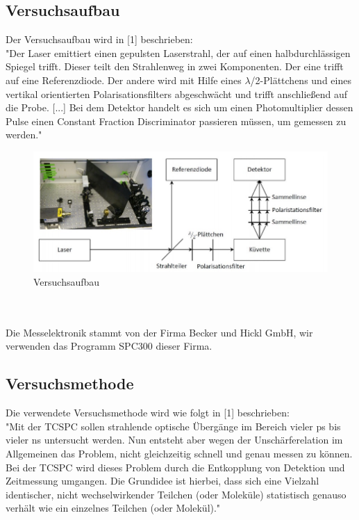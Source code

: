 \documentclass{article}
\begin{document}
\subsection{Versuchsaufbau}
Der Versuchsaufbau wird in [1] beschrieben:\\
"Der Laser emittiert einen gepulsten Laserstrahl, der auf einen halbdurchlässigen Spiegel trifft.
Dieser teilt den Strahlenweg in zwei Komponenten. Der eine trifft auf eine Referenzdiode. Der
andere wird mit Hilfe eines $\lambda$/2-Plättchens und eines vertikal orientierten Polarisationsfilters
abgeschwächt und trifft anschließend auf die Probe. [...] Bei dem Detektor handelt es sich
um einen Photomultiplier dessen Pulse einen Constant Fraction Discriminator passieren
müssen, um gemessen zu werden."
\begin{figure}[h]
  \centering
  \includegraphics[width=\textwidth]{Bilder/aufbau.jpeg}
  \caption{Versuchsaufbau}
\end{figure}
\\
\\
Die Messelektronik stammt von der Firma Becker und Hickl GmbH, wir verwenden das Programm SPC300 dieser Firma.


\subsection{Versuchsmethode}
Die verwendete Versuchsmethode wird wie folgt in [1] beschrieben: \\
"Mit der TCSPC sollen strahlende optische Übergänge im Bereich vieler ps bis vieler ns
untersucht werden. Nun entsteht aber wegen der Unschärferelation im Allgemeinen das
Problem, nicht gleichzeitig schnell und genau messen zu können. Bei der TCSPC wird dieses
Problem durch die Entkopplung von Detektion und Zeitmessung umgangen. Die Grundidee ist
hierbei, dass sich eine Vielzahl identischer, nicht wechselwirkender Teilchen (oder Moleküle)
statistisch genauso verhält wie ein einzelnes Teilchen (oder Molekül)."
\end{document}

